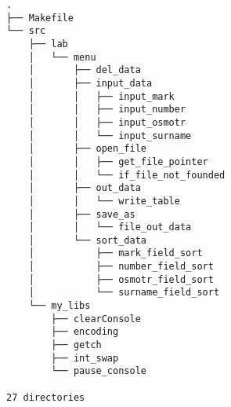 {

\scriptsize

\begin{verbatim}
.
├── Makefile
└── src
    ├── lab
    │   └── menu
    │       ├── del_data
    │       ├── input_data
    │       │   ├── input_mark
    │       │   ├── input_number
    │       │   ├── input_osmotr
    │       │   └── input_surname
    │       ├── open_file
    │       │   ├── get_file_pointer
    │       │   └── if_file_not_founded
    │       ├── out_data
    │       │   └── write_table
    │       ├── save_as
    │       │   └── file_out_data
    │       └── sort_data
    │           ├── mark_field_sort
    │           ├── number_field_sort
    │           ├── osmotr_field_sort
    │           └── surname_field_sort
    └── my_libs
        ├── clearConsole
        ├── encoding
        ├── getch
        ├── int_swap
        └── pause_console

27 directories
\end{verbatim}

}